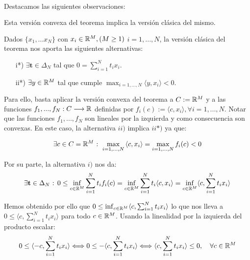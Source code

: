 	\paragraph{} Destacamos las siguientes observaciones:
	
	\begin{observacion}
		Esta versión convexa del teorema implica la versión clásica del mismo.
	\end{observacion}

	Dados $ \{x_1,...x_N\}$ con $ x_i \in \mathbb{R}^M , (M \geq 1 )$ $i=1,...,N$, la versión clásica del teorema nos aporta las siguientes alternativas:

	\begin{itemize}
		\item[i*)] $ \exists \mathbf{t} \in \Delta_N $ tal que $ 0 = \sum_{i=1}^{N}{t_i x_i}$.
		\item[ii*)] $ \exists y \in \mathbb{R}^M $ tal que cumple $ \max_{i=1,...,N} \langle y, x_i \rangle < 0 $.
	\end{itemize}

	Para ello, basta aplicar la versión convexa del teorema a $ C := \mathbb{R}^M $ y a las funciones $ f_1,...,f_N : C \longrightarrow \mathbb{R} $ definidas por $ f_i(c):=\langle c,x_i \rangle , \forall i=1,...,N  $. Notar que las funciones $ f_1,...,f_N $ son lineales por la izquierda y como consecuencia son convexas. En este caso, la alternativa $ ii) $ implica $ ii*) $ ya que:
	
	\begin{equation*}
		\exists c \in C = \mathbb{R}^M \text{ : } \max_{i=1,...,N} {\langle c,x_i \rangle}  =  \max_{i=1,...,N}f_i (c) < 0 
	\end{equation*}
	
	Por su parte, la alternativa $ i) $ nos da:
	\begin{equation*}
		\exists \mathbf{t} \in \Delta_N \text{ : } 0 \leq \inf_{c \in \mathbb{R}^M}  \sum_{i=1}^{N}{t_i f_i(c) } = \inf_{c \in \mathbb{R}^M} \sum_{i=1}^{N}{t_i\langle c,x_i \rangle} = \inf_{c \in \mathbb{R}^M} \langle c, \sum_{i=1}^{N}{t_i x_i} \rangle 
	\end{equation*}
	
	Hemos obtenido por ello que  $0  \leq \inf_{c \in \mathbb{R}^M} \langle c, \sum_{i=1}^{N}{t_i x_i} \rangle  $ lo que nos lleva a $ 0 \leq \langle c, \sum_{i=1}^{N}{t_i x_i} \rangle  $ para todo $ c \in \mathbb{R}^M $. Usando la linealidad por la izquierda del producto escalar:
	\[
	0 \leq \langle -c, \sum_{i=1}^{N}{t_i x_i} \rangle \Longleftrightarrow 	0 \leq -\langle c, \sum_{i=1}^{N}{t_i x_i} \rangle 
	\Longleftrightarrow  \langle c, \sum_{i=1}^{N}{t_i x_i}\rangle \leq 0, \quad \forall c \in \mathbb{R}^M
	\]
	
